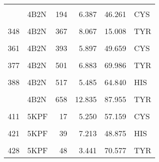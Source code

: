 \begin{table}
\begin{tabular}{llrrrl}
			\cellcolor{gray!6}{300} & \cellcolor{gray!6}{4B2N} & \cellcolor{gray!6}{191} & \cellcolor{gray!6}{4.436} & \cellcolor{gray!6}{51.391} & \cellcolor{gray!6}{CYS}\\
			\addlinespace
			303 & 4B2N & 194 & 6.387 & 46.261 & CYS\\
			\cellcolor{gray!6}{304} & \cellcolor{gray!6}{4B2N} & \cellcolor{gray!6}{195} & \cellcolor{gray!6}{2.206} & \cellcolor{gray!6}{82.691} & \cellcolor{gray!6}{HIS}\\
			348 & 4B2N & 367 & 8.067 & 15.008 & TYR\\
			\cellcolor{gray!6}{358} & \cellcolor{gray!6}{4B2N} & \cellcolor{gray!6}{390} & \cellcolor{gray!6}{4.550} & \cellcolor{gray!6}{58.866} & \cellcolor{gray!6}{CYS}\\
			361 & 4B2N & 393 & 5.897 & 49.659 & CYS\\
			\addlinespace
			\cellcolor{gray!6}{362} & \cellcolor{gray!6}{4B2N} & \cellcolor{gray!6}{394} & \cellcolor{gray!6}{2.083} & \cellcolor{gray!6}{86.758} & \cellcolor{gray!6}{HIS}\\
			377 & 4B2N & 501 & 6.883 & 69.986 & TYR\\
			\cellcolor{gray!6}{386} & \cellcolor{gray!6}{4B2N} & \cellcolor{gray!6}{515} & \cellcolor{gray!6}{7.504} & \cellcolor{gray!6}{74.964} & \cellcolor{gray!6}{TYR}\\
			388 & 4B2N & 517 & 5.485 & 64.840 & HIS\\
			\cellcolor{gray!6}{397} & \cellcolor{gray!6}{4B2N} & \cellcolor{gray!6}{641} & \cellcolor{gray!6}{2.116} & \cellcolor{gray!6}{78.315} & \cellcolor{gray!6}{HIS}\\
			\addlinespace
			403 & 4B2N & 658 & 12.835 & 87.955 & TYR\\
			\cellcolor{gray!6}{408} & \cellcolor{gray!6}{5KPF} & \cellcolor{gray!6}{14} & \cellcolor{gray!6}{2.972} & \cellcolor{gray!6}{78.361} & \cellcolor{gray!6}{CYS}\\
			411 & 5KPF & 17 & 5.250 & 57.159 & CYS\\
			\cellcolor{gray!6}{412} & \cellcolor{gray!6}{5KPF} & \cellcolor{gray!6}{18} & \cellcolor{gray!6}{2.349} & \cellcolor{gray!6}{57.026} & \cellcolor{gray!6}{HIS}\\
			421 & 5KPF & 39 & 7.213 & 48.875 & HIS\\
			\addlinespace
			\cellcolor{gray!6}{426} & \cellcolor{gray!6}{5KPF} & \cellcolor{gray!6}{46} & \cellcolor{gray!6}{5.270} & \cellcolor{gray!6}{38.339} & \cellcolor{gray!6}{TYR}\\
			428 & 5KPF & 48 & 3.441 & 70.577 & TYR\\

\end{tabular}
\end{table}
